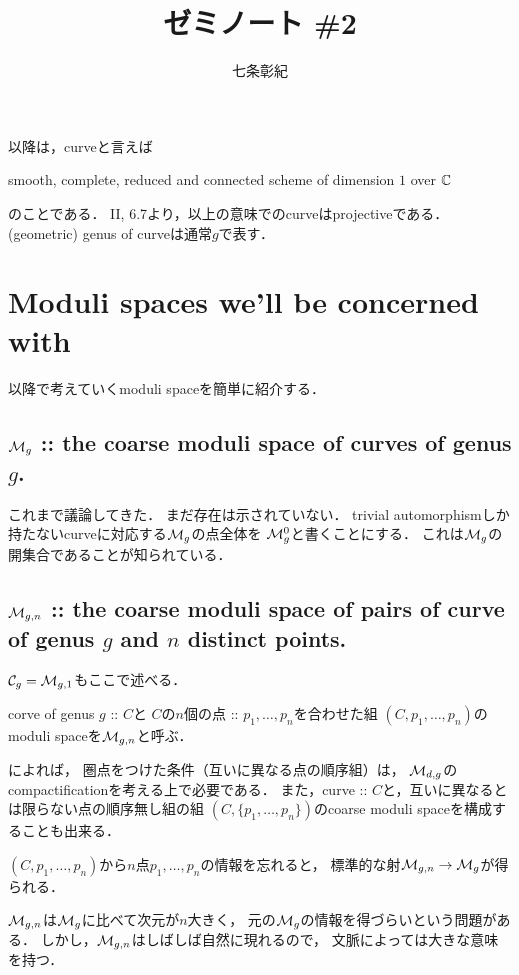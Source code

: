 \documentclass[a4paper]{jsarticle}
\newcommand{\tp}[2]{\texorpdfstring{#1}{#2}}
\newcommand{\modC}{\mathcal{C}}
\begin{document}
\title{ゼミノート \#2}
\author{七条彰紀}
\maketitle
    以降は，curveと言えば
    \begin{center}
        smooth, complete, reduced and connected scheme of dimension $1$ over $\mathbb{C}$
    \end{center}
    のことである．
    \cite{HarAG} II, 6.7より，以上の意味でのcurveはprojectiveである．
    (geometric) genus of curveは通常$g$で表す．

\section{ Moduli spaces we'll be concerned with }
    以降で考えていくmoduli spaceを簡単に紹介する．

    \subsection{\tp{$\mathcal{M}_g$}{Mg}
        :: the coarse moduli space of curves of genus \tp{$g$}{g}. }
    これまで議論してきた．
    まだ存在は示されていない．
    trivial automorphismしか持たないcurveに対応する$\mathcal{M}_g$の点全体を
    $\mathcal{M}_g^0$と書くことにする．
    これは$\mathcal{M}_g$の開集合であることが知られている．

    \subsection{\tp{$\mathcal{M}_{g,n}$}{Mgn}
        :: the coarse moduli space of pairs of curve of genus \tp{$g$}{g} and \tp{$n$}{n} distinct points. }
    $\modC_g=\modM_{g,1}$もここで述べる．

    corve of genus $g$ :: $C$と
    $C$の$n$個の点 :: $p_1,\dots, p_n$を合わせた組
    $(C, p_1,\dots, p_n)$のmoduli spaceを$\mathcal{M}_{g,n}$と呼ぶ．

    \cite{HaMo}によれば，
    圏点をつけた条件（互いに異なる点の順序組）は，
    $\mathcal{M}_{d,g}$のcompactificationを考える上で必要である．
    また，curve :: $C$と，互いに異なるとは限らない点の順序無し組の組
    $(C, \{p_1,\dots,p_n\})$のcoarse moduli spaceを構成することも出来る．

    $(C, p_1,\dots,p_n)$から$n$点$p_1,\dots,p_n$の情報を忘れると，
    標準的な射$\mathcal{M}_{g,n} \to \mathcal{M}_g$が得られる．

    $\mathcal{M}_{g,n}$は$\mathcal{M}_g$に比べて次元が$n$大きく，
    元の$\mathcal{M}_g$の情報を得づらいという問題がある．
    しかし，$\mathcal{M}_{g,n}$はしばしば自然に現れるので，
    文脈によっては大きな意味を持つ．
\end{document}
